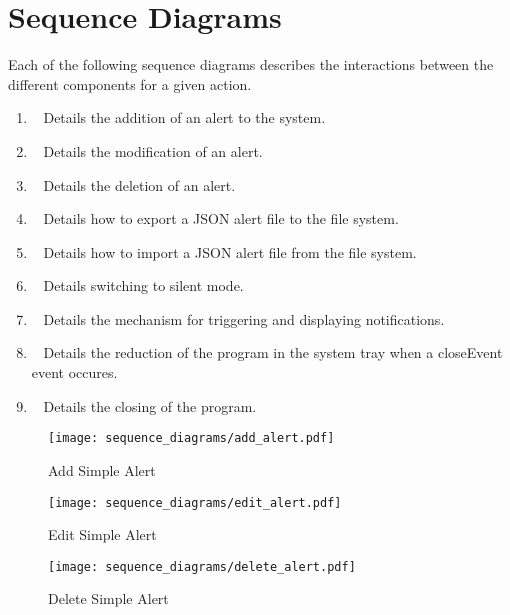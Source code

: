 \chapter{Sequence Diagrams}\label{ch:sequence_diagrams}
Each of the following sequence diagrams describes the interactions between the different components for a given action.\\
\begin{enumerate}
    \item~ Details the addition of an alert to the system.
    \item~ Details the modification of an alert.
    \item~ Details the deletion of an alert.
    \item~ Details how to export a JSON alert file to the file system.
    \item~ Details how to import a JSON alert file from the file system.
    \item~ Details switching to silent mode.
    \item~ Details the mechanism for triggering and displaying notifications.
    \item~ Details the reduction of the program in the system tray when a closeEvent event occures.
    \item~ Details the closing of the program.
\end{enumerate}

\begin{figure}[]
	\centering
    \caption{Add Simple Alert}\label{fig:sd_add_simple_alert}
    \texttt{[image: sequence\_diagrams/add\_alert.pdf]}
\end{figure}

\begin{figure}[]
	\centering
    \caption{Edit Simple Alert}\label{fig:sd_edit_simple_alert}
    \texttt{[image: sequence\_diagrams/edit\_alert.pdf]}
\end{figure}

\begin{figure}[]
	\centering
    \caption{Delete Simple Alert}\label{fig:sd_delete_simple_alert}
    \texttt{[image: sequence\_diagrams/delete\_alert.pdf]}
\end{figure}

